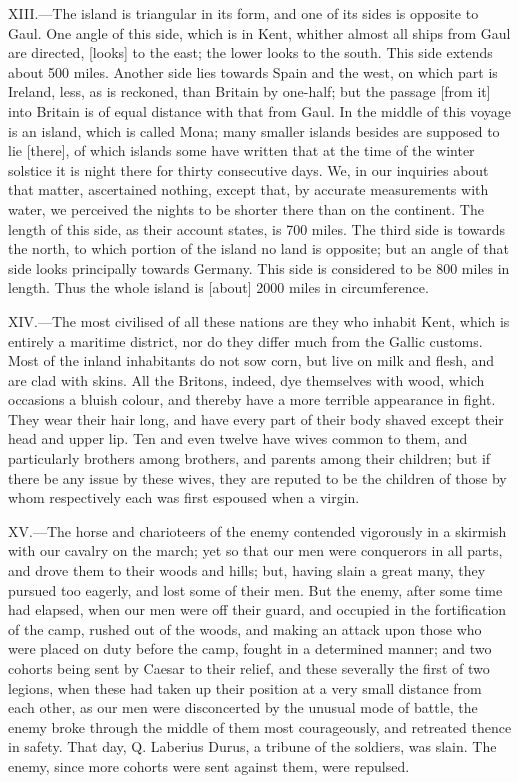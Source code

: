 XIII.—The island is triangular in its form, and one of its sides is
opposite to Gaul. One angle of this side, which is in Kent, whither
almost all ships from Gaul are directed, [looks] to the east; the lower
looks to the south. This side extends about 500 miles. Another side lies
towards Spain and the west, on which part is Ireland, less, as is
reckoned, than Britain by one-half; but the passage [from it] into
Britain is of equal distance with that from Gaul. In the middle of this
voyage is an island, which is called Mona; many smaller islands besides
are supposed to lie [there], of which islands some have written that at
the time of the winter solstice it is night there for thirty consecutive
days. We, in our inquiries about that matter, ascertained nothing,
except that, by accurate measurements with water, we perceived the
nights to be shorter there than on the continent. The length of this
side, as their account states, is 700 miles. The third side is towards
the north, to which portion of the island no land is opposite; but an
angle of that side looks principally towards Germany. This side is
considered to be 800 miles in length. Thus the whole island is [about]
2000 miles in circumference.

XIV.—The most civilised of all these nations are they who inhabit Kent,
which is entirely a maritime district, nor do they differ much from the
Gallic customs. Most of the inland inhabitants do not sow corn, but live
on milk and flesh, and are clad with skins. All the Britons, indeed, dye
themselves with wood, which occasions a bluish colour, and thereby have
a more terrible appearance in fight. They wear their hair long, and have
every part of their body shaved except their head and upper lip. Ten and
even twelve have wives common to them, and particularly brothers among
brothers, and parents among their children; but if there be any issue by
these wives, they are reputed to be the children of those by whom
respectively each was first espoused when a virgin.

XV.—The horse and charioteers of the enemy contended vigorously in a
skirmish with our cavalry on the march; yet so that our men were
conquerors in all parts, and drove them to their woods and hills; but,
having slain a great many, they pursued too eagerly, and lost some of
their men. But the enemy, after some time had elapsed, when our men were
off their guard, and occupied in the fortification of the camp, rushed
out of the woods, and making an attack upon those who were placed on
duty before the camp, fought in a determined manner; and two cohorts
being sent by Caesar to their relief, and these severally the first of
two legions, when these had taken up their position at a very small
distance from each other, as our men were disconcerted by the unusual
mode of battle, the enemy broke through the middle of them most
courageously, and retreated thence in safety. That day, Q. Laberius
Durus, a tribune of the soldiers, was slain. The enemy, since more
cohorts were sent against them, were repulsed.

